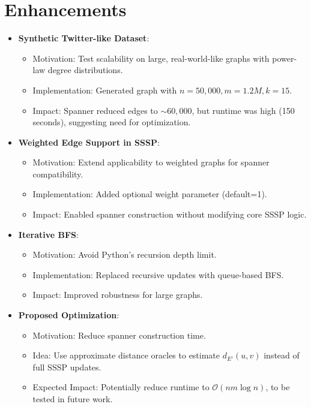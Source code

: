 \documentclass[11pt]{article}
\begin{document}
\section{Enhancements}
\begin{itemize}
    \item \textbf{Synthetic Twitter-like Dataset}:
    \begin{itemize}
        \item Motivation: Test scalability on large, real-world-like graphs with power-law degree distributions.
        \item Implementation: Generated graph with $n=50,000, m=1.2M, k=15$.
        \item Impact: Spanner reduced edges to $\sim 60,000$, but runtime was high (150 seconds), suggesting need for optimization.
    \end{itemize}
    \item \textbf{Weighted Edge Support in SSSP}:
    \begin{itemize}
        \item Motivation: Extend applicability to weighted graphs for spanner compatibility.
        \item Implementation: Added optional weight parameter (default=1).
        \item Impact: Enabled spanner construction without modifying core SSSP logic.
    \end{itemize}
    \item \textbf{Iterative BFS}:
    \begin{itemize}
        \item Motivation: Avoid Python’s recursion depth limit.
        \item Implementation: Replaced recursive updates with queue-based BFS.
        \item Impact: Improved robustness for large graphs.
    \end{itemize}
    \item \textbf{Proposed Optimization}:
    \begin{itemize}
        \item Motivation: Reduce spanner construction time.
        \item Idea: Use approximate distance oracles to estimate $d_{E'}(u,v)$ instead of full SSSP updates.
        \item Expected Impact: Potentially reduce runtime to $\mathcal{O}(nm \log n)$, to be tested in future work.
    \end{itemize}
\end{itemize}
\end{document}
